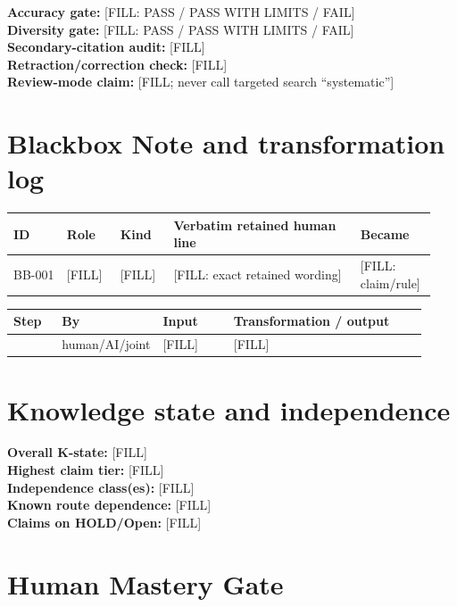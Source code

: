 \documentclass[11pt]{article}
\begin{document}
\medskip
\noindent\textbf{Accuracy gate:} [FILL: PASS / PASS WITH LIMITS / FAIL]\\
\textbf{Diversity gate:} [FILL: PASS / PASS WITH LIMITS / FAIL]\\
\textbf{Secondary-citation audit:} [FILL]\\
\textbf{Retraction/correction check:} [FILL]\\
\textbf{Review-mode claim:} [FILL; never call targeted search ``systematic'']

\section{Blackbox Note and transformation log}
\label{app:blackbox}

\begin{longtable}{@{}p{0.12\linewidth}p{0.12\linewidth}p{0.12\linewidth}p{0.42\linewidth}p{0.16\linewidth}@{}}
\toprule
ID & Role & Kind & Verbatim retained human line & Became\\
\midrule
\endhead
BB-001 & [FILL] & [FILL] & [FILL: exact retained wording] & [FILL: claim/rule]\\
\bottomrule
\end{longtable}

\medskip
\begin{longtable}{@{}p{0.12\linewidth}p{0.12\linewidth}p{0.18\linewidth}p{0.50\linewidth}@{}}
\toprule
Step & By & Input & Transformation / output\\
\midrule
\endhead
[FILL] & human/AI/joint & [FILL] & [FILL]\\
\bottomrule
\end{longtable}

\section{Knowledge state and independence}
\label{app:kstate}

\noindent\textbf{Overall K-state:} [FILL]\\
\textbf{Highest claim tier:} [FILL]\\
\textbf{Independence class(es):} [FILL]\\
\textbf{Known route dependence:} [FILL]\\
\textbf{Claims on HOLD/Open:} [FILL]

\section{Human Mastery Gate}
\label{app:mastery}
\end{document}
